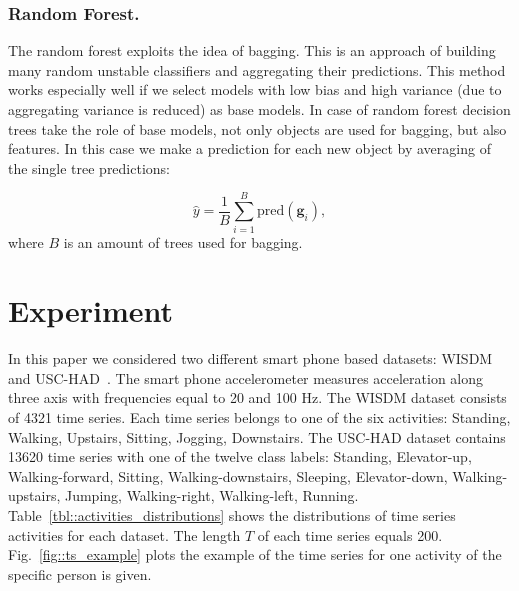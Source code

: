 \documentclass{llncs}
\begin{document}
\subsubsection{Random Forest.}
The random forest exploits the idea of bagging. This is an approach of building many random unstable classifiers and aggregating their predictions. This method works especially well if we select models with low bias and high variance (due to aggregating variance is reduced) as base models. In case of random forest decision trees take the role of base models, not only objects are used for bagging, but also features. In this case we make a prediction for each new object by averaging of the single tree predictions:

\begin{equation*}
\hat{y} = \frac{1}{B} \sum_{i=1}^{B} \text{pred}(\bm{g}_i),
\end{equation*}
where $B$ is an amount of trees used for bagging.

\section{Experiment}
In this paper we considered two different smart phone based datasets: WISDM~\cite{wisdm} and USC-HAD~\cite{usc}. 
The smart phone accelerometer measures acceleration along three axis with frequencies equal to 20 and 100 Hz. 
The WISDM dataset consists of 4321 time series. Each time series belongs to one of the six activities: Standing, Walking, Upstairs, Sitting, Jogging, Downstairs. The USC-HAD dataset contains 13620 time series with one of the twelve class labels: Standing, Elevator-up, Walking-forward, Sitting, Walking-downstairs, Sleeping, Elevator-down, Walking-upstairs, Jumping, Walking-right, Walking-left, Running.
Table~\ref{tbl::activities_distributions} shows the distributions of time series activities for each dataset. 
The length $T$ of each time series equals 200. 
Fig.~\ref{fig::ts_example} plots the example of the time series for one activity of the specific person is given.
\end{document}
